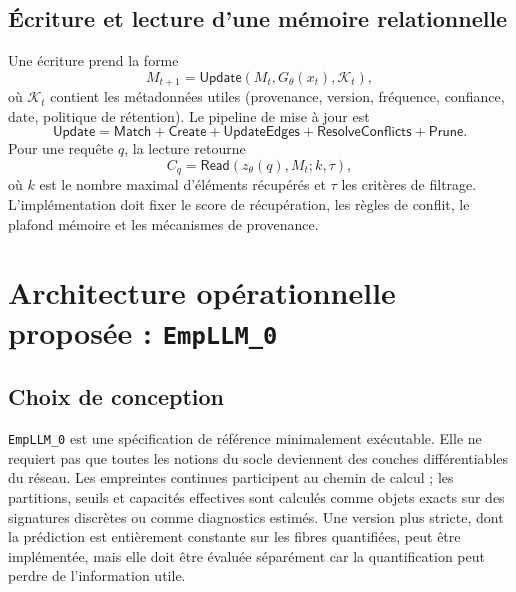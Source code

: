 \documentclass[11pt,a4paper]{article}
\theoremstyle{remark}
\begin{document}
\subsection{Écriture et lecture d'une mémoire relationnelle}
Une écriture prend la forme
\[
M_{t+1}=\mathsf{Update}(M_t,G_\theta(x_t),\mathcal K_t),
\]
où $\mathcal K_t$ contient les métadonnées utiles (provenance, version, fréquence, confiance, date, politique de rétention). Le pipeline de mise à jour est
\[
\mathsf{Update}=\mathsf{Match}+\mathsf{Create}+\mathsf{UpdateEdges}+\mathsf{ResolveConflicts}+\mathsf{Prune}.
\]
Pour une requête $q$, la lecture retourne
\[
C_q=\mathsf{Read}(z_\theta(q),M_t;k,\tau),
\]
où $k$ est le nombre maximal d'éléments récupérés et $\tau$ les critères de filtrage. L'implémentation doit fixer le score de récupération, les règles de conflit, le plafond mémoire et les mécanismes de provenance.

\section{Architecture opérationnelle proposée : \texttt{EmpLLM\_0}}

\subsection{Choix de conception}
\texttt{EmpLLM\_0} est une spécification de référence minimalement exécutable. Elle ne requiert pas que toutes les notions du socle deviennent des couches différentiables du réseau. Les empreintes continues participent au chemin de calcul ; les partitions, seuils et capacités effectives sont calculés comme objets exacts sur des signatures discrètes ou comme diagnostics estimés. Une version plus stricte, dont la prédiction est entièrement constante sur les fibres quantifiées, peut être implémentée, mais elle doit être évaluée séparément car la quantification peut perdre de l'information utile.
\end{document}
